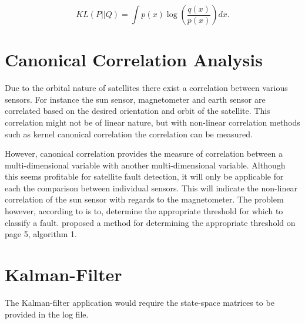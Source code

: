 \begin{equation}
	KL(P\lvert\lvert Q) = \int p(x) \log \left( \frac{q(x)}{p(x)} \right)dx.
\end{equation}

\section{Canonical Correlation Analysis}
Due to the orbital nature of satellites there exist a correlation between various sensors. For instance the sun sensor, magnetometer and earth sensor are correlated based on the desired orientation and orbit of the satellite. This correlation might not be of linear nature, but with non-linear correlation methods such as kernel canonical correlation the correlation can be measured.

However, canonical correlation provides the measure of correlation between a multi-dimensional variable with another multi-dimensional variable. Although this seems profitable for satellite fault detection, it will only be applicable for each the comparison between individual sensors. This will indicate the non-linear correlation of the sun sensor with regards to the magnetometer. The problem however, according to \cite{chen2017fault} is to, determine the appropriate threshold for which to classify a fault. \cite{chen2017fault} proposed a method for determining the appropriate threshold on page 5, algorithm 1.
\cite{fukumizu2007statistical}
\cite{zhu2017quality}

\section{Kalman-Filter}
The Kalman-filter application would require the state-space matrices to be provided in the log file.
